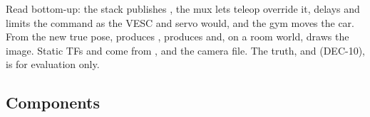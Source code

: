 \documentclass[11pt,a4paper]{article}
\begin{document}
Read bottom-up: the stack publishes , the mux lets teleop override it,  delays and limits the command as the VESC and servo would, and the gym moves the car. From the new true pose,  produces ,  produces  and, on a room world,  draws the image. Static TFs \arrowto{} and \arrowto{}\arrowto{} come from ,  and the camera file. The truth, \arrowto{} and  (DEC-10), is for evaluation only.

\subsection{Components}
\end{document}
